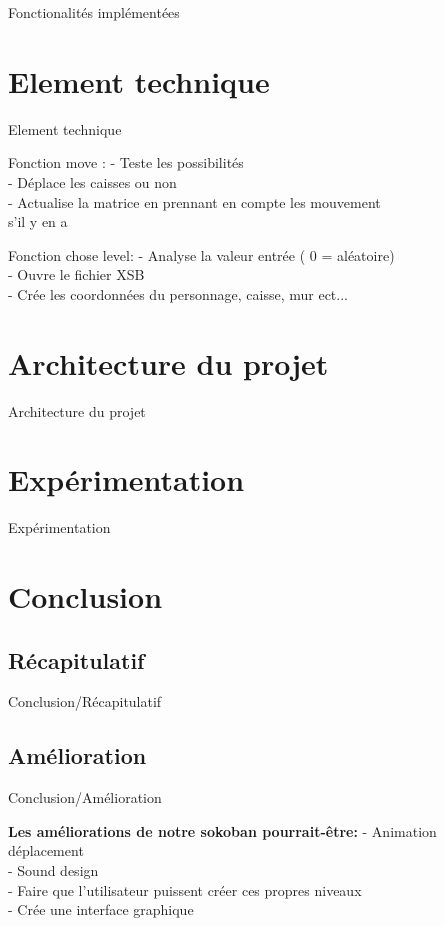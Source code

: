 \documentclass{beamer}
\begin{document}
\begin{frame}{Fonctionalités implémentées}

\end{frame}
\section{Element technique}
\begin{frame}{Element technique}

\begin{block}{Fonction move :} 
- Teste les possibilités \\
- Déplace les caisses ou non \\
- Actualise la matrice en prennant en compte les mouvement \\ s'il y en a \\
\end{block}
\begin{block}{Fonction chose level:} 
- Analyse la valeur entrée ( 0 = aléatoire) \\
- Ouvre le fichier XSB  \\
- Crée les coordonnées du personnage, caisse, mur ect... 
\end{block}
\end{frame}

\section{Architecture du projet}
\begin{frame}{Architecture du projet}

\end{frame}

\section{Expérimentation}
\begin{frame}{Expérimentation}

\end{frame}


\section{Conclusion}
\subsection{Récapitulatif}
\begin{frame}{Conclusion/Récapitulatif}

\end{frame}

\subsection{Amélioration}
\begin{frame}{Conclusion/Amélioration}

\textbf{Les améliorations de notre sokoban pourrait-être:}
 - Animation déplacement \\
 - Sound design \\
 - Faire que l'utilisateur puissent créer ces propres niveaux \\
 - Crée une interface graphique
\end{frame}
\end{document}
